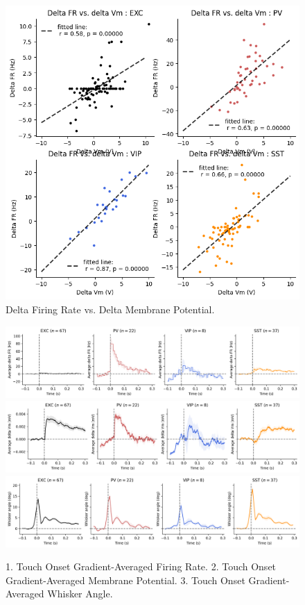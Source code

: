 \documentclass{IEEEtran}
\begin{document}
\begin{figure}[h!]
  \centering
  \includegraphics[width=\columnwidth]{figures/given/12_delta_FRvsdelta_Vm.png}
  \caption{Delta Firing Rate vs. Delta Membrane Potential.}%
  \label{fig:12}
\end{figure}

\begin{figure}[h!]
  \centering
  \includegraphics[width=0.9\columnwidth]{figures/given/13_TouchOnset_GRD_AVG_FiringRate.png}
  \includegraphics[width=0.9\columnwidth]{figures/given/13_TouchOnset_GRD_AVG_Vm.png}
  \includegraphics[width=0.9\columnwidth]{figures/given/13_TouchOnset_GRD_AVG_WhiskerAngle.png}
  \caption{1. Touch Onset Gradient-Averaged Firing Rate. 2. Touch Onset Gradient-Averaged Membrane Potential. 3. Touch Onset Gradient-Averaged Whisker Angle.}%
  \label{fig:13}
\end{figure}
\end{document}
